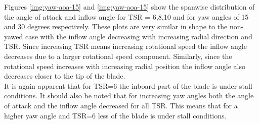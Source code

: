Figures \ref{img:yaw-aoa-15} and \ref{img:yaw-aoa-15} show the spanwise distribution of the angle of attack and inflow angle for TSR = 6,8,10 and for yaw angles of 15 and 30 degrees respectively. These plots are very similar in shape to the non-yawed case with the inflow angle decreasing with increasing radial direction and TSR. Since increasing TSR means increasing rotational speed the inflow angle decreases due to a larger rotational speed component. Similarly, since the rotational speed increases with increasing radial position the inflow angle also decreases closer to the tip of the blade. \\

It is again apparent that for TSR=6 the inboard part of the blade is under stall conditions. It should also be noted that for increasing yaw angles both the angle of attack and the inflow angle decreased for all TSR. This means that for a higher yaw angle and TSR=6 less of the blade is under stall conditions.

